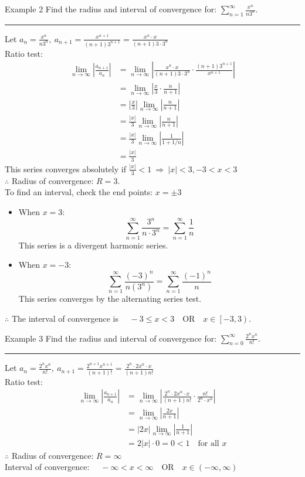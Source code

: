 \documentclass[12pt,a4paper]{article}
\begin{document}
\begin{eg}{Example 2}
	Find the radius and interval of convergence for: $\displaystyle\sum^\infty_{n=1}\frac{x^n}{n3^n}.$	\\
	\noindent\rule[0.25\baselineskip]{\textwidth}{1pt}
	Let $\displaystyle a_n=\frac{x^n}{n3^n},\ a_{n+1}=\frac{x^{n+1}}{(n+1)3^{n+1}}=\frac{x^n\cdot x}{(n+1)3\cdot3^n}$\\
	Ratio test:
	$$\begin{aligned}
		\lim_{n\to\infty}\left|\frac{a_{n+1}}{a_n}\right|&=\lim_{n\to\infty}\left|\frac{x^n\cdot x}{(n+1)3\cdot3^n}\cdot\frac{(n+1)3^{n+1}}{x^{n+1}}\right|\\
		&=\lim_{n\to\infty}\left|\frac{x}{3}\cdot\frac{n}{n+1}\right|\\
		&=\left|\frac{x}{3}\right|\lim_{n\to\infty}\left|\frac{n}{n+1}\right|\\
		&=\frac{|x|}{3}\lim_{n\to\infty}\left|\frac{n}{n+1}\right|\\
		&=\frac{|x|}{3}\lim_{n\to\infty}\left|\frac{1}{1+1/n}\right|\\
		&=\frac{|x|}{3}
	\end{aligned}$$
	This series converges absolutely if $\displaystyle\frac{|x|}{3}<1\ \Rightarrow\ |x|<3, -3<x<3$\\
	$\therefore$ Radius of convergence: $R=3$.\\
	To find an interval, check the end points: $x=\pm3$
	\begin{itemize}
		\item When $x=3$: $$\sum^\infty_{n=1}\frac{3^n}{n\cdot3^n}=\sum^\infty_{n=1}\frac{1}{n}$$ This series is a divergent harmonic series.
		\item When $x=-3$: $$\sum^\infty_{n=1}\frac{(-3)^n}{n(3^n)}=\sum^\infty_{n=1}\frac{(-1)^n}{n}$$ This series converges by the alternating series test. 
	\end{itemize}
	$\therefore$ The interval of convergence is $\quad-3\leq x<3\quad\text{OR}\quad x\in\left[-3\right.,\left.3\right).$
\end{eg}
\begin{eg}{Example 3}
	Find the radius and interval of convergence for: $\displaystyle\sum^\infty_{n=0}\frac{2^nx^n}{n!}.$\\
	\noindent\rule[0.25\baselineskip]{\textwidth}{1pt}
	Let $\displaystyle a_n=\frac{2^nx^n}{n!},\ a_{n+1}=\frac{2^{n+1}x^{n+1}}{(n+1)!}=\frac{2^n\cdot2x^n\cdot x}{(n+1)n!}$\\
	Ratio test: 
	$$\begin{aligned}
		\lim_{n\to\infty}\left|\frac{a_{n+1}}{a_n}\right|&=\lim_{n\to\infty}\left|\frac{2^n\cdot2x^n\cdot x}{(n+1)n!}\cdot\frac{n!}{2^n\cdot x^n}\right|\\
		&=\lim_{n\to\infty}\left|\frac{2x}{n+1}\right|\\
		&=|2x|\lim_{n\to\infty}\left|\frac{1}{n+1}\right|\\
		&=2|x|\cdot0=0<1\quad\text{for all }x
	\end{aligned}$$
	$\therefore$ Radius of convergence: $R=\infty$\\
	Interval of convergence: $\quad-\infty<x<\infty\quad\text{OR}\quad x\in\left(-\infty,\infty\right)$
\end{eg}
\end{document}
